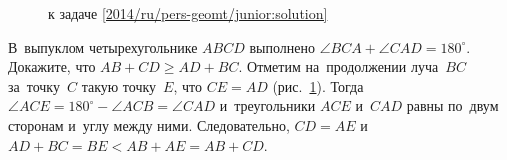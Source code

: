 \ifsolution
\begin{figure}\centering
    \caption{к задаче \ref{2014/ru/pers-geomt/junior:solution}}
    \label{2014/ru/pers-geomt/junior:solution:fig}
\end{figure}%
\fi %

\problem
В~выпуклом четырехугольнике $ABCD$ выполнено
$\angle BCA + \angle CAD = 180^\circ$.
Докажите, что $AB + CD \geq AD + BC$.
\solution
\label{2014/ru/pers-geomt/junior:solution}%
Отметим на~продолжении луча~$BC$ за~точку~$C$ такую точку~$E$, что $CE = AD$
(рис.~\ref{2014/ru/pers-geomt/junior:solution:fig}).
Тогда $\angle ACE = 180^\circ - \angle ACB = \angle CAD$ и~треугольники $ACE$
и~$CAD$ равны по~двум сторонам и~углу между ними.
Следовательно, $CD = AE$ и~$AD + BC = BE < AB + AE = AB + CD$.
\endproblem
